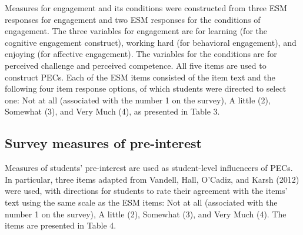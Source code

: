\documentclass[]{msu-thesis}
\theoremstyle{definition}
\theoremstyle{definition}
\theoremstyle{definition}
\theoremstyle{remark}
\begin{document}
Measures for engagement and its conditions were constructed from three
ESM responses for engagement and two ESM responses for the conditions of
engagement. The three variables for engagement are for learning (for the
cognitive engagement construct), working hard (for behavioral
engagement), and enjoying (for affective engagement). The variables for
the conditions are for perceived challenge and perceived competence. All
five items are used to construct PECs. Each of the ESM items consisted
of the item text and the following four item response options, of which
students were directed to select one: Not at all (associated with the
number 1 on the survey), A little (2), Somewhat (3), and Very Much (4),
as presented in Table 3.

\begin{table}

\caption{\label{tab:unnamed-chunk-5}ESM measures for profiles of engagement and its conditions (PECs)}
\centering
{}
\end{table}

\subsection{Survey measures of
pre-interest}\label{survey-measures-of-pre-interest}

Measures of students' pre-interest are used as student-level influencers
of PECs. In particular, three items adapted from Vandell, Hall, O'Cadiz,
and Karsh (2012) were used, with directions for students to rate their
agreement with the items' text using the same scale as the ESM items:
Not at all (associated with the number 1 on the survey), A little (2),
Somewhat (3), and Very Much (4). The items are presented in Table 4.
\end{document}
